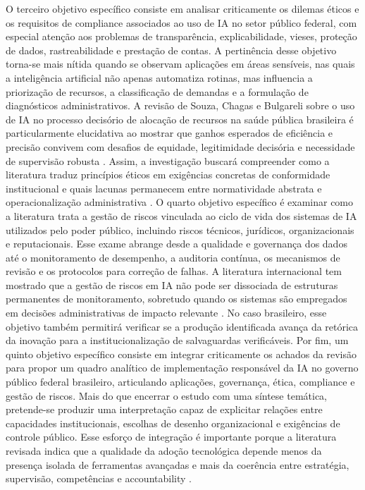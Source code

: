 \documentclass[12pt,a4paper]{article}
\begin{document}
O terceiro objetivo específico consiste em analisar criticamente os dilemas éticos e os requisitos de compliance associados ao uso de IA no setor público federal, com especial atenção aos problemas de transparência, explicabilidade, vieses, proteção de dados, rastreabilidade e prestação de contas. A pertinência desse objetivo torna-se mais nítida quando se observam aplicações em áreas sensíveis, nas quais a inteligência artificial não apenas automatiza rotinas, mas influencia a priorização de recursos, a classificação de demandas e a formulação de diagnósticos administrativos. A revisão de Souza, Chagas e Bulgareli sobre o uso de IA no processo decisório de alocação de recursos na saúde pública brasileira é particularmente elucidativa ao mostrar que ganhos esperados de eficiência e precisão convivem com desafios de equidade, legitimidade decisória e necessidade de supervisão robusta \autocite{souza2025uso}. Assim, a investigação buscará compreender como a literatura traduz princípios éticos em exigências concretas de conformidade institucional e quais lacunas permanecem entre normatividade abstrata e operacionalização administrativa \autocite{brkan2020legal} \autocite{mkander2023auditing}.
O quarto objetivo específico é examinar como a literatura trata a gestão de riscos vinculada ao ciclo de vida dos sistemas de IA utilizados pelo poder público, incluindo riscos técnicos, jurídicos, organizacionais e reputacionais. Esse exame abrange desde a qualidade e governança dos dados até o monitoramento de desempenho, a auditoria contínua, os mecanismos de revisão e os protocolos para correção de falhas. A literatura internacional tem mostrado que a gestão de riscos em IA não pode ser dissociada de estruturas permanentes de monitoramento, sobretudo quando os sistemas são empregados em decisões administrativas de impacto relevante \autocite{minkkinen2022continuous} \autocite{mkander2023auditing} \autocite{parycek2023artificial}. No caso brasileiro, esse objetivo também permitirá verificar se a produção identificada avança da retórica da inovação para a institucionalização de salvaguardas verificáveis.
Por fim, um quinto objetivo específico consiste em integrar criticamente os achados da revisão para propor um quadro analítico de implementação responsável da IA no governo público federal brasileiro, articulando aplicações, governança, ética, compliance e gestão de riscos. Mais do que encerrar o estudo com uma síntese temática, pretende-se produzir uma interpretação capaz de explicitar relações entre capacidades institucionais, escolhas de desenho organizacional e exigências de controle público. Esse esforço de integração é importante porque a literatura revisada indica que a qualidade da adoção tecnológica depende menos da presença isolada de ferramentas avançadas e mais da coerência entre estratégia, supervisão, competências e accountability \autocite{david2023understanding} \autocite{goulart2025processos} \autocite{souza2025uso}.
\end{document}

